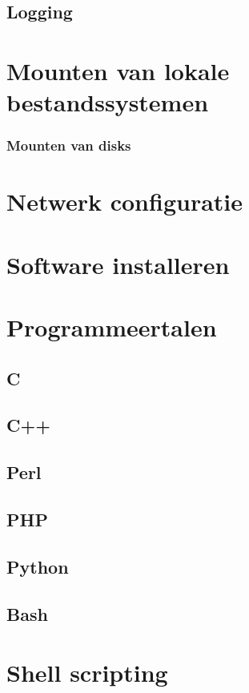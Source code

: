 \documentclass[a4paper,12pt,twoside,openright,titlepage]{book}
\begin{document}
\section{Logging}

\chapter{Mounten van lokale bestandssystemen}

\subsection{Mounten van disks}


\chapter{Netwerk configuratie}

\chapter{Software installeren}

\chapter{Programmeertalen}

\section{C}
\section{C++}
\section{Perl}
\section{PHP}
\section{Python}
\section{Bash}

\chapter{Shell scripting}

\end{document}

